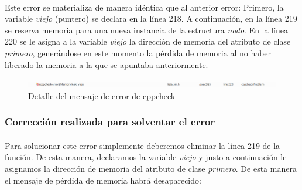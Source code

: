			\paragraph{}Este error se materializa de manera idéntica que al anterior error: Primero, la variable \textit{viejo} (puntero) se declara en la línea 218. A continuación, en la línea 219 se reserva memoria para una nueva instancia de la estructura \textit{nodo}. En la línea 220 se le asigna a la variable \textit{viejo} la dirección de memoria del atributo de clase \textit{primero}, generándose en este momento la pérdida de memoria al no haber liberado la memoria a la que se apuntaba anteriormente.
			
			\begin{figure}[H]
				\centering
				\includegraphics[scale=0.38]{img/captura46.png}
				\caption{Detalle del mensaje de error de cppcheck}
				\label{captura46}
			\end{figure}
	
		\subsubsection{Corrección realizada para solventar el error}
		
			\paragraph{}Para solucionar este error simplemente deberemos eliminar la línea 219 de la función. De esta manera, declaramos la variable \textit{viejo} y justo a continuación le asignamos la dirección de memoria del atributo de clase \textit{primero}. De esta manera el mensaje de pérdida de memoria habrá desaparecido:
	
